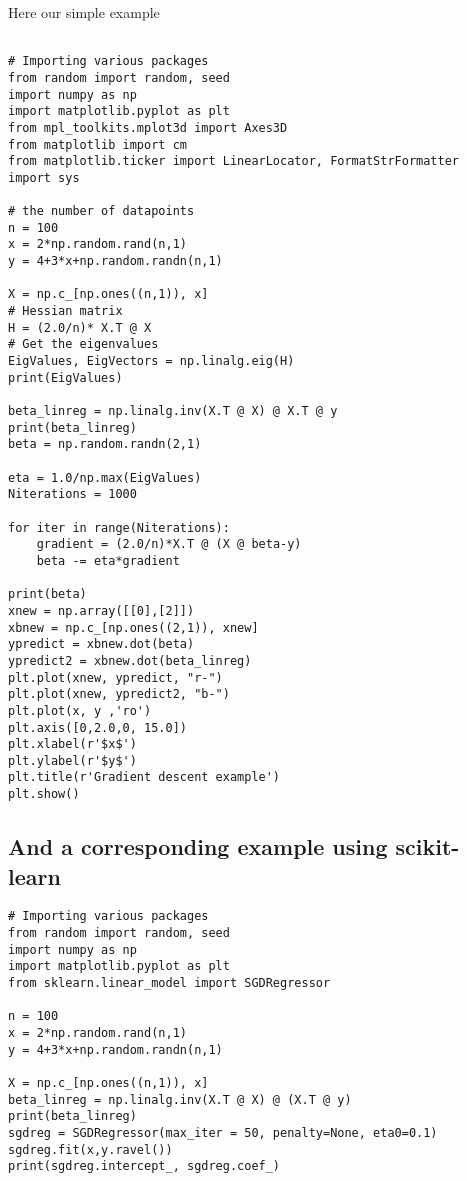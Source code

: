 \documentclass[%
oneside,                 %
final,                   %
10pt]{article}
\begin{document}
Here our simple example
\begin{verbatim}

# Importing various packages
from random import random, seed
import numpy as np
import matplotlib.pyplot as plt
from mpl_toolkits.mplot3d import Axes3D
from matplotlib import cm
from matplotlib.ticker import LinearLocator, FormatStrFormatter
import sys

# the number of datapoints
n = 100
x = 2*np.random.rand(n,1)
y = 4+3*x+np.random.randn(n,1)

X = np.c_[np.ones((n,1)), x]
# Hessian matrix
H = (2.0/n)* X.T @ X
# Get the eigenvalues
EigValues, EigVectors = np.linalg.eig(H)
print(EigValues)

beta_linreg = np.linalg.inv(X.T @ X) @ X.T @ y
print(beta_linreg)
beta = np.random.randn(2,1)

eta = 1.0/np.max(EigValues)
Niterations = 1000

for iter in range(Niterations):
    gradient = (2.0/n)*X.T @ (X @ beta-y)
    beta -= eta*gradient

print(beta)
xnew = np.array([[0],[2]])
xbnew = np.c_[np.ones((2,1)), xnew]
ypredict = xbnew.dot(beta)
ypredict2 = xbnew.dot(beta_linreg)
plt.plot(xnew, ypredict, "r-")
plt.plot(xnew, ypredict2, "b-")
plt.plot(x, y ,'ro')
plt.axis([0,2.0,0, 15.0])
plt.xlabel(r'$x$')
plt.ylabel(r'$y$')
plt.title(r'Gradient descent example')
plt.show()

\end{verbatim}

\subsection*{And a corresponding example using \textbf{scikit-learn}}

\begin{verbatim}
# Importing various packages
from random import random, seed
import numpy as np
import matplotlib.pyplot as plt
from sklearn.linear_model import SGDRegressor

n = 100
x = 2*np.random.rand(n,1)
y = 4+3*x+np.random.randn(n,1)

X = np.c_[np.ones((n,1)), x]
beta_linreg = np.linalg.inv(X.T @ X) @ (X.T @ y)
print(beta_linreg)
sgdreg = SGDRegressor(max_iter = 50, penalty=None, eta0=0.1)
sgdreg.fit(x,y.ravel())
print(sgdreg.intercept_, sgdreg.coef_)

\end{verbatim}
\end{document}
